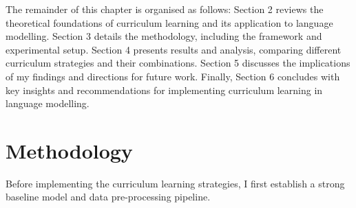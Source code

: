     
    

The remainder of this chapter is organised as follows: Section 2 reviews the theoretical foundations of curriculum learning and its application to language modelling. Section 3 details the methodology, including the \climb framework and experimental setup. Section 4 presents results and analysis, comparing different curriculum strategies and their combinations. Section 5 discusses the implications of my findings and directions for future work. Finally, Section 6 concludes with key insights and recommendations for implementing curriculum learning in language modelling.

\section{Methodology}

Before implementing the curriculum learning strategies, I first establish a strong baseline model and data pre-processing pipeline. 

